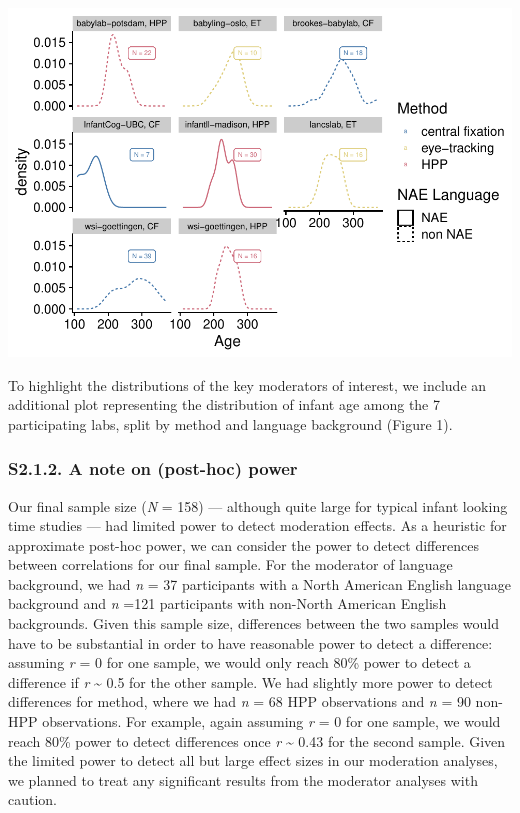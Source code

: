 \documentclass[
  man, donotrepeattitle,floatsintext]{apa6}
\begin{document}
\includegraphics{MB1T_supplement_files/figure-latex/descriptives-1.pdf}

To highlight the distributions of the key moderators of interest, we include an additional plot representing the distribution of infant age among the 7 participating labs, split by method and language background (Figure 1).

\hypertarget{s2.1.2.-a-note-on-post-hoc-power}{%
\subsubsection{S2.1.2. A note on (post-hoc) power}\label{s2.1.2.-a-note-on-post-hoc-power}}

Our final sample size (\emph{N} = 158) --- although quite large for typical infant looking time studies --- had limited power to detect moderation effects. As a heuristic for approximate post-hoc power, we can consider the power to detect differences between correlations for our final sample. For the moderator of language background, we had \emph{n} = 37 participants with a North American English language background and \emph{n} =121 participants with non-North American English backgrounds. Given this sample size, differences between the two samples would have to be substantial in order to have reasonable power to detect a difference: assuming \emph{r} = 0 for one sample, we would only reach 80\% power to detect a difference if \emph{r} \textasciitilde{} 0.5 for the other sample. We had slightly more power to detect differences for method, where we had \emph{n} = 68 HPP observations and \emph{n} = 90 non-HPP observations. For example, again assuming \emph{r} = 0 for one sample, we would reach 80\% power to detect differences once \emph{r} \textasciitilde{} 0.43 for the second sample. Given the limited power to detect all but large effect sizes in our moderation analyses, we planned to treat any significant results from the moderator analyses with caution.
\end{document}
